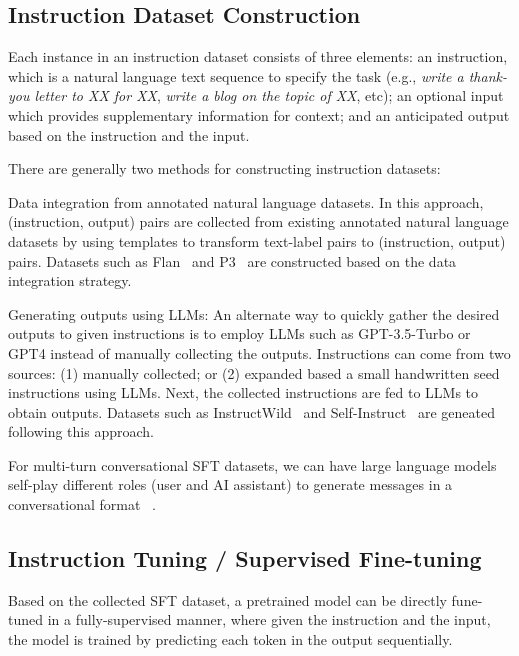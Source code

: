 \documentclass[11pt]{article}
\begin{document}
\subsection{Instruction Dataset Construction}
Each instance in an instruction dataset consists of three elements: an instruction, which is a natural language text sequence to specify the task (e.g., {\it write a thank-you letter to XX for XX}, {\it write a blog on the topic of XX}, etc); an optional input which provides supplementary information for context; and an anticipated output based on the instruction and the input. 

There are generally two methods for constructing instruction datasets:
\begin{tightitemize}
\item Data integration from annotated natural language datasets. In this approach, (instruction, output) pairs are collected from existing annotated natural language datasets by using templates to transform text-label pairs to (instruction, output) pairs. Datasets such as Flan~\citep{longpre2023flan} and P3~\citep{sanh2021multitask} are constructed based on the data integration strategy.

\item Generating outputs using LLMs: An alternate way to quickly gather the desired outputs to given instructions is to employ LLMs such as GPT-3.5-Turbo or GPT4 instead of manually collecting the outputs. Instructions can come from two sources: (1) manually collected; or (2) expanded based a small handwritten seed instructions using LLMs. Next, the collected instructions are fed to LLMs to obtain outputs. Datasets such as InstructWild~\citep{instructionwild} and Self-Instruct~\citep{wang2022self} are geneated following this approach.
\end{tightitemize}

For multi-turn conversational SFT datasets, we can have  large language models self-play different roles (user and AI assistant) to generate messages in a conversational format ~\citep{xu2023baize}.

\subsection{Instruction Tuning / Supervised Fine-tuning}
Based on the collected SFT dataset, a pretrained model can be directly fune-tuned in a fully-supervised manner, where given the instruction and the input, the model is trained by predicting each token in the output sequentially. 
\end{document}
